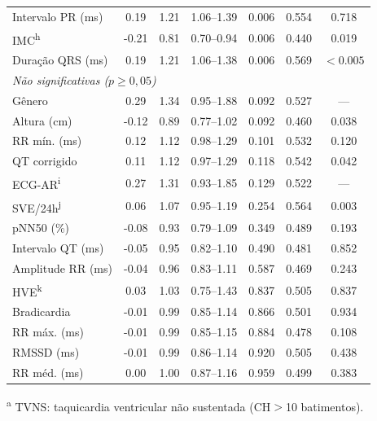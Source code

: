 \begin{table}[htbp]
{\begin{tabular}{lcccccc}
			Intervalo PR (ms)
			 & 0.19  & 1.21 & 1.06--1.39 & 0.006     & 0.554   & 0.718          \\
			IMC\textsuperscript{h}
			 & -0.21 & 0.81 & 0.70--0.94 & 0.006     & 0.440   & 0.019          \\
			Dura\c{c}\~ao QRS (ms)
			 & 0.19  & 1.21 & 1.06--1.38 & 0.006     & 0.569   & $<0.005$       \\
			\midrule
			\multicolumn{7}{l}{\textit{Não significativas ($p \geq 0{,}05$)}}   \\
			\addlinespace
			G\^enero
			 & 0.29  & 1.34 & 0.95--1.88 & 0.092     & 0.527   & ---            \\
			Altura (cm)
			 & -0.12 & 0.89 & 0.77--1.02 & 0.092     & 0.460   & 0.038          \\
			RR m\'in. (ms)
			 & 0.12  & 1.12 & 0.98--1.29 & 0.101     & 0.532   & 0.120          \\
			QT corrigido
			 & 0.11  & 1.12 & 0.97--1.29 & 0.118     & 0.542   & 0.042          \\
			ECG-AR\textsuperscript{i}
			 & 0.27  & 1.31 & 0.93--1.85 & 0.129     & 0.522   & ---            \\
			SVE/24h\textsuperscript{j}
			 & 0.06  & 1.07 & 0.95--1.19 & 0.254     & 0.564   & 0.003          \\
			pNN50 (\%)
			 & -0.08 & 0.93 & 0.79--1.09 & 0.349     & 0.489   & 0.193          \\
			Intervalo QT (ms)
			 & -0.05 & 0.95 & 0.82--1.10 & 0.490     & 0.481   & 0.852          \\
			Amplitude RR (ms)
			 & -0.04 & 0.96 & 0.83--1.11 & 0.587     & 0.469   & 0.243          \\
			HVE\textsuperscript{k}
			 & 0.03  & 1.03 & 0.75--1.43 & 0.837     & 0.505   & 0.837          \\
			Bradicardia
			 & -0.01 & 0.99 & 0.85--1.14 & 0.866     & 0.501   & 0.934          \\
			RR m\'ax. (ms)
			 & -0.01 & 0.99 & 0.85--1.15 & 0.884     & 0.478   & 0.108          \\
			RMSSD (ms)
			 & -0.01 & 0.99 & 0.86--1.14 & 0.920     & 0.505   & 0.438          \\
			RR m\'ed. (ms)
			 & 0.00  & 1.00 & 0.87--1.16 & 0.959     & 0.499   & 0.383          \\
			\bottomrule
		\end{tabular}%
	}
	\begin{flushleft}
		\footnotesize
		\textsuperscript{a} TVNS: taquicardia ventricular não sustentada (CH$>$10 batimentos).\\

\end{flushleft}
\end{table}
